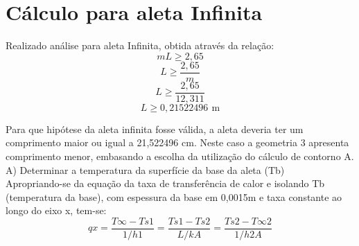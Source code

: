 
\vspace{-1.5cm}\section{Cálculo para aleta Infinita}\label{sec:infity}

Realizado análise para aleta Infinita, obtida através da relação:\\
\begin{equation}
    {m}{L}\geq{2,65}
\end{equation}
\begin{equation}
    {L}\geq{\frac{2,65}{m}}
\end{equation}
\begin{equation}
    {L}\geq{\frac{2,65}{12,311 }}
\end{equation}
\begin{equation}
    {L}\geq{0,21522496\,\SI{}{\meter}}
\end{equation}
\par Para que hipótese da aleta infinita fosse válida, a aleta deveria ter um
comprimento maior ou igual a 21,522496 cm.
Neste caso a geometria 3 apresenta comprimento menor, embasando a
escolha da utilização do cálculo de contorno A.
\newline
\newline
{\ABNTEXchapterfont\Large{A) Determinar a temperatura da superfície da base da aleta (Tb)}}\\
Apropriando-se da equação da taxa de transferência de calor e isolando Tb (temperatura da base), com espessura da base em 0,0015m e taxa constante ao longo do eixo x, tem-se:
\begin{equation}
    {qx}={\frac{T\infty-Ts1}{1/{h1}}}={\frac{Ts1-Ts2}{L/{{k}{A}}}}={\frac{Ts2-T\infty2}{1/{h2}{A}}}
\end{equation}
